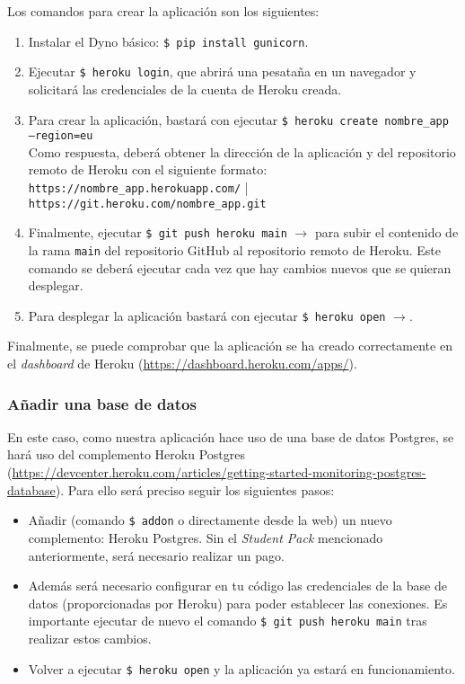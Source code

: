 Los comandos para crear la aplicación son los siguientes:

\begin{enumerate}
    \item Instalar el Dyno básico: \texttt{\$ pip install gunicorn}.
    
    \item Ejecutar \texttt{\$ heroku login}, que abrirá una pesataña en un navegador y solicitará las credenciales de la cuenta de Heroku creada.
    
    \item Para crear la aplicación, bastará con ejecutar \texttt{\$ heroku create nombre\_app --region=eu} \\
    Como respuesta, deberá obtener la dirección de la aplicación y del repositorio remoto de Heroku con el siguiente formato: \\
    \texttt{https://nombre\_app.herokuapp.com/} | \texttt{https://git.heroku.com/nombre\_app.git}
    
    \item Finalmente, ejecutar \texttt{\$ git push heroku main} $\to$ para subir el contenido de la rama \texttt{main} del repositorio GitHub al repositorio remoto de Heroku. Este comando se deberá ejecutar cada vez que hay cambios nuevos que se quieran desplegar.
    
    \item Para desplegar la aplicación bastará con ejecutar \texttt{\$ heroku open} $\to$.
\end{enumerate}

Finalmente, se puede comprobar que la aplicación se ha creado correctamente en el \textit{dashboard} de Heroku (\url{https://dashboard.heroku.com/apps/}).

\subsubsection{Añadir una base de datos}
En este caso, como nuestra aplicación hace uso de una base de datos Postgres, se hará uso del complemento Heroku Postgres (\url{https://devcenter.heroku.com/articles/getting-started-monitoring-postgres-database}). Para ello será preciso seguir los siguientes pasos:

\begin{itemize}
    \item Añadir (comando \texttt{\$ addon} o directamente desde la web) un nuevo complemento: Heroku Postgres. Sin el \textit{Student Pack} mencionado anteriormente, será necesario realizar un pago.
    
    \item Además será necesario configurar en tu código las credenciales de la base de datos (proporcionadas por Heroku) para poder establecer las conexiones. Es importante ejecutar de nuevo el comando \texttt{\$ git push heroku main} tras realizar estos cambios.

    \item Volver a ejecutar \texttt{\$ heroku open} y la aplicación ya estará en funcionamiento.
\end{itemize}

